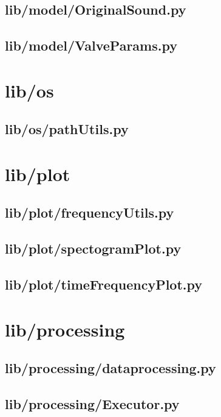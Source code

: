 \subsection*{lib/model/OriginalSound.py}
\label{ap:OriginalSound}
\subsection*{lib/model/ValveParams.py}
\label{ap:ValveParams}
\section{lib/os}
\subsection*{lib/os/pathUtils.py}
\label{ap:pathUtils}
\section{lib/plot}
\subsection*{lib/plot/frequencyUtils.py}
\label{ap:frequencyUtils}
\subsection*{lib/plot/spectogramPlot.py}
\label{ap:spectogramPlot}
\subsection*{lib/plot/timeFrequencyPlot.py}
\label{ap:timeFrequencyPlot}
\section{lib/processing}
\subsection*{lib/processing/dataprocessing.py}
\label{ap:dataprocessing}
\subsection*{lib/processing/Executor.py}
\label{ap:Executor}
